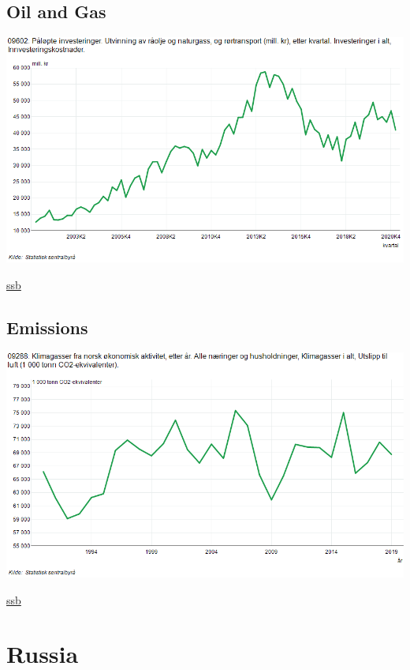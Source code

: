 \documentclass[
]{book}
\begin{document}
\hypertarget{oil-and-gas}{%
\subsection{Oil and Gas}\label{oil-and-gas}}

\includegraphics{fig/ssb_oljegassinvesteringer_norge.png}

\href{https://www.ssb.no/statbank/table/09602/chartViewLine/}{ssb}

\hypertarget{emissions}{%
\subsection{Emissions}\label{emissions}}

\includegraphics{fig/ssb_klimagassutslipp_norge.png}

\href{https://www.ssb.no/statbank/table/09288/chartViewLine/}{ssb}

\hypertarget{russia}{%
\section{Russia}\label{russia}}
\end{document}
